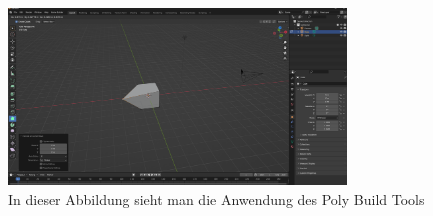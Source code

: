 \begin{itemize}
\begin{figure}[H]
        \centering
        \includegraphics[width=0.8\textwidth]{chapters/13/images/PolyBuild.png}
        \caption{In dieser Abbildung sieht man die Anwendung des Poly Build Tools}
        \label{UST-13}
    \end{figure}
\end{itemize}


